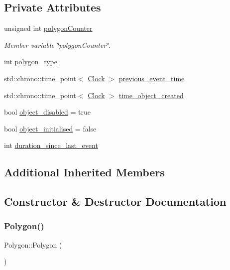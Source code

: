 \subsection*{Private Attributes}
\begin{DoxyCompactItemize}
\item 
unsigned int \mbox{\hyperlink{classPolygon_a4292b71e5bf6d76a09f582dedf81c862}{polygon\+Counter}}
\begin{DoxyCompactList}\small\item\em Member variable \char`\"{}polygon\+Counter\char`\"{}. \end{DoxyCompactList}\item 
int \mbox{\hyperlink{classPolygon_aba437ec0b8ab34ca435e1a653c69b558}{polygon\+\_\+type}}
\item 
std\+::chrono\+::time\+\_\+point$<$ \mbox{\hyperlink{universe_8h_a0ef8d951d1ca5ab3cfaf7ab4c7a6fd80}{Clock}} $>$ \mbox{\hyperlink{classPolygon_a46fa35a90ffcf375c8eceb2cf8a169d0}{previous\+\_\+event\+\_\+time}}
\item 
std\+::chrono\+::time\+\_\+point$<$ \mbox{\hyperlink{universe_8h_a0ef8d951d1ca5ab3cfaf7ab4c7a6fd80}{Clock}} $>$ \mbox{\hyperlink{classPolygon_af5b19b47f12f4984521d6f48a45c1428}{time\+\_\+object\+\_\+created}}
\item 
bool \mbox{\hyperlink{classPolygon_ada7d263fdf6c7a6138c71ca93bbea02f}{object\+\_\+disabled}} = true
\item 
bool \mbox{\hyperlink{classPolygon_a1c59030523e7784edf3c17dad240c821}{object\+\_\+initialised}} = false
\item 
int \mbox{\hyperlink{classPolygon_a06161c2266baa0d3ef7afeeeccc0547b}{duration\+\_\+since\+\_\+last\+\_\+event}}
\end{DoxyCompactItemize}
\subsection*{Additional Inherited Members}


\subsection{Constructor \& Destructor Documentation}
\mbox{\label{classPolygon_ac183e712f8be1e13f1c9d5b4d4512ead}} 
\subsubsection{\texorpdfstring{Polygon()}{Polygon()}\hspace{0.1cm}{\footnotesize\ttfamily [1/4]}}
{\footnotesize\ttfamily Polygon\+::\+Polygon (\begin{DoxyParamCaption}{ }\end{DoxyParamCaption})\hspace{0.3cm}{\ttfamily [inline]}}

